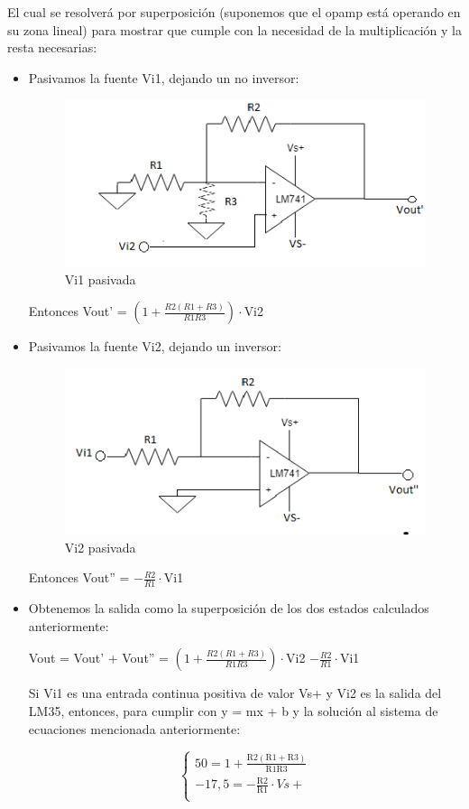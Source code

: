 \documentclass[../../main.tex]{subfiles}
\begin{document}
El cual se resolverá por superposición (suponemos que el opamp está operando en su zona lineal) para mostrar que cumple con la necesidad de la multiplicación y la resta necesarias:
\begin{itemize}
\item Pasivamos la fuente Vi1, dejando un no inversor:
\begin{figure}[H]	%
	\centering
	\includegraphics[scale=1.3]{imagenes/adder_pasivo_vi1.png}
	\caption{Vi1 pasivada}
	\label{fig:ej6_adder_pasivo_vi1}
\end{figure}
Entonces Vout' = $(1+\frac{R2(R1+R3)}{R1R3})\cdot$Vi2

\item Pasivamos la fuente Vi2, dejando un inversor:
\begin{figure}[H]	%
	\centering
	\includegraphics[scale=1.3]{imagenes/adder_pasivo_vi2.png}
	\caption{Vi2 pasivada}
	\label{fig:ej6_adder_pasivo_vi2}
\end{figure}

Entonces Vout'' = $-\frac{R2}{R1}\cdot$Vi1
\item Obtenemos la salida como la superposición de los dos estados calculados anteriormente:\par
Vout = Vout' + Vout'' = $(1+\frac{R2(R1+R3)}{R1R3})\cdot$Vi2 $-\frac{R2}{R1}\cdot$Vi1\par

Si Vi1 es una entrada continua positiva de valor Vs+ y Vi2 es la salida del LM35, entonces, para cumplir con y = mx + b y la solución al sistema de ecuaciones mencionada anteriormente: \par
	 \begin{equation}
  	   \left\{
	  	    \begin{array}{ll}
		 					50 = 1+\mathrm{\frac{R2(R1+R3)}{R1R3}}\\
			 				-17,5 = \mathrm{-\frac{R2}{R1}\cdot}Vs+ \\
	     	 \end{array}
	     	\right.
 	\end{equation}


\end{itemize}
\end{document}
